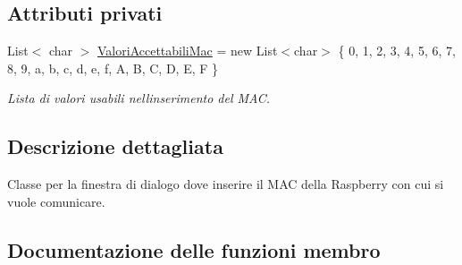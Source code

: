 \subsection*{Attributi privati}
\begin{DoxyCompactItemize}
\item 
\mbox{\label{classclient__app_1_1_window_m_a_c_a97452c34d38d311e5a54c4278e01f2e0}} 
List$<$ char $>$ \mbox{\hyperlink{classclient__app_1_1_window_m_a_c_a97452c34d38d311e5a54c4278e01f2e0}{Valori\+Accettabili\+Mac}} = new List$<$char$>$ \{ \textquotesingle{}0\textquotesingle{}, \textquotesingle{}1\textquotesingle{}, \textquotesingle{}2\textquotesingle{}, \textquotesingle{}3\textquotesingle{}, \textquotesingle{}4\textquotesingle{}, \textquotesingle{}5\textquotesingle{}, \textquotesingle{}6\textquotesingle{}, \textquotesingle{}7\textquotesingle{}, \textquotesingle{}8\textquotesingle{}, \textquotesingle{}9\textquotesingle{}, \textquotesingle{}a\textquotesingle{}, \textquotesingle{}b\textquotesingle{}, \textquotesingle{}c\textquotesingle{}, \textquotesingle{}d\textquotesingle{}, \textquotesingle{}e\textquotesingle{}, \textquotesingle{}f\textquotesingle{}, \textquotesingle{}A\textquotesingle{}, \textquotesingle{}B\textquotesingle{}, \textquotesingle{}C\textquotesingle{}, \textquotesingle{}D\textquotesingle{}, \textquotesingle{}E\textquotesingle{}, \textquotesingle{}F\textquotesingle{} \}
\begin{DoxyCompactList}\small\item\em Lista di valori usabili nell\textquotesingle{}inserimento del M\+AC. \end{DoxyCompactList}\end{DoxyCompactItemize}


\subsection{Descrizione dettagliata}
Classe per la finestra di dialogo dove inserire il M\+AC della Raspberry con cui si vuole comunicare. 

\subsection{Documentazione delle funzioni membro}
\mbox{\label{classclient__app_1_1_window_m_a_c_aae7242aa53e9b5d8155ae1b567ee3665}} 
